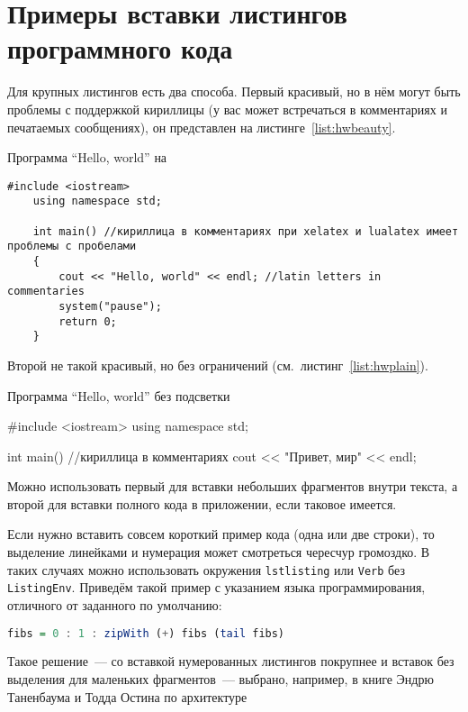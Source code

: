 \chapter{Примеры вставки листингов программного кода} \label{AppendixA}

Для крупных листингов есть два способа. Первый красивый, но в нём могут быть проблемы с поддержкой кириллицы (у вас может встречаться в комментариях и
печатаемых сообщениях), он представлен на листинге~\ref{list:hwbeauty}.
\begin{ListingEnv}[!h]%
    \caption{Программа “Hello, world” на \protect\cpp}
    \label{list:hwbeauty}
    \begin{lstlisting}[language={[ISO]C++}]
	#include <iostream>
	using namespace std;

	int main() //кириллица в комментариях при xelatex и lualatex имеет проблемы с пробелами
	{
		cout << "Hello, world" << endl; //latin letters in commentaries
		system("pause");
		return 0;
	}
    \end{lstlisting}
\end{ListingEnv}%
Второй не такой красивый, но без ограничений (см.~листинг~\ref{list:hwplain}).
\begin{ListingEnv}[!h]
    \caption{Программа “Hello, world” без подсветки}
    \label{list:hwplain}
    \begin{Verb}
        
        #include <iostream>
        using namespace std;
        
        int main() //кириллица в комментариях
        {
            cout << "Привет, мир" << endl;
        }
    \end{Verb}
\end{ListingEnv}

Можно использовать первый для вставки небольших фрагментов
внутри текста, а второй для вставки полного
кода в приложении, если таковое имеется.

Если нужно вставить совсем короткий пример кода (одна или две строки), то выделение  линейками и нумерация может смотреться чересчур громоздко. В таких случаях можно использовать окружения \texttt{lstlisting} или \texttt{Verb} без \texttt{ListingEnv}. Приведём такой пример с указанием языка программирования, отличного от заданного по умолчанию:
\begin{lstlisting}[language=Haskell]
fibs = 0 : 1 : zipWith (+) fibs (tail fibs)
\end{lstlisting}
Такое решение~--- со вставкой нумерованных листингов покрупнее
и вставок без выделения для маленьких фрагментов~--- выбрано,
например, в книге Эндрю Таненбаума и Тодда Остина по архитектуре

